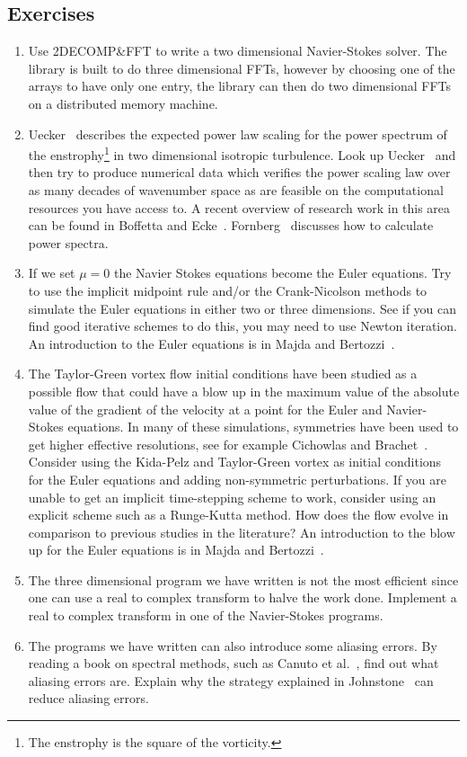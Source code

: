 \subsection{Exercises}
\begin{enumerate}
\item[1)] Use 2DECOMP{\&}FFT to write a two dimensional Navier-Stokes solver. The library is built to do three dimensional FFTs, however by choosing one of the arrays to have only one entry, the library can then do two dimensional FFTs on a distributed memory machine.
\item[2)] Uecker~\cite{Uec09} describes the expected power law scaling for the power spectrum of the enstrophy\footnote{The enstrophy is the square of the vorticity.} in two dimensional isotropic turbulence. Look up Uecker~\cite{Uec09} and then try to produce numerical data which verifies the power scaling law over as many decades of wavenumber space as are feasible on the computational resources you have access to. A recent overview of research work in this area can be found in Boffetta and Ecke~\cite{BofEck12}. Fornberg~\cite{For77} discusses how to calculate power spectra.
\item[3)] If we set $\mu=0$ the Navier Stokes equations become the Euler equations. Try to use the implicit midpoint rule and/or the Crank-Nicolson methods to simulate the Euler equations in either two or three dimensions. See if you can find good iterative schemes to do this, you may need to use Newton iteration. An introduction to the Euler equations is in Majda and Bertozzi~\cite{MajBer02}.
\item[4)] The Taylor-Green vortex flow initial conditions have been studied as a possible flow that could have a blow up in the maximum value of the absolute value of the gradient of the velocity at a point for the Euler and Navier-Stokes equations. In many of these simulations, symmetries have been used to get higher effective resolutions, see for example Cichowlas and Brachet~\cite{CicBra05}. Consider using the Kida-Pelz and Taylor-Green vortex as initial conditions for the Euler equations and adding non-symmetric perturbations. If you are unable to get an implicit time-stepping scheme to work, consider using an explicit scheme such as a Runge-Kutta method. How does the flow evolve in comparison to previous studies in the literature? An introduction to the blow up for the Euler equations is in Majda and Bertozzi~\cite{MajBer02}.
\item[5)] The three dimensional program we have written is not the most efficient since one can use a real to complex transform to halve the work done. Implement a real to complex transform in one of the Navier-Stokes programs.
\item[6)] The programs we have written can also introduce some aliasing errors.  By reading a book on spectral methods, such as Canuto et al.~\cite{CHQZ07}, find out what aliasing errors are. Explain why the strategy explained in Johnstone~\cite{Joh12} can reduce aliasing errors. 
\end{enumerate}
